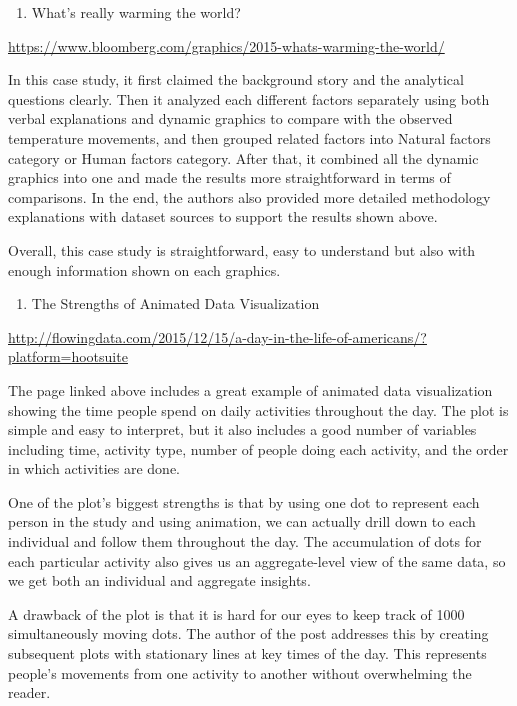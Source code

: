 \documentclass[]{book}
\providecommand{\tightlist}{%
  \setlength{\itemsep}{0pt}\setlength{\parskip}{0pt}}
\theoremstyle{definition}
\theoremstyle{definition}
\theoremstyle{definition}
\theoremstyle{remark}
\begin{document}
\begin{enumerate}
\def\labelenumi{\arabic{enumi}.}
\setcounter{enumi}{5}
\tightlist
\item
  What's really warming the world?
\end{enumerate}

\url{https://www.bloomberg.com/graphics/2015-whats-warming-the-world/}

In this case study, it first claimed the background story and the
analytical questions clearly. Then it analyzed each different factors
separately using both verbal explanations and dynamic graphics to
compare with the observed temperature movements, and then grouped
related factors into Natural factors category or Human factors category.
After that, it combined all the dynamic graphics into one and made the
results more straightforward in terms of comparisons. In the end, the
authors also provided more detailed methodology explanations with
dataset sources to support the results shown above.

Overall, this case study is straightforward, easy to understand but also
with enough information shown on each graphics.

\begin{enumerate}
\def\labelenumi{\arabic{enumi}.}
\setcounter{enumi}{6}
\tightlist
\item
  The Strengths of Animated Data Visualization
\end{enumerate}

\url{http://flowingdata.com/2015/12/15/a-day-in-the-life-of-americans/?platform=hootsuite}

The page linked above includes a great example of animated data
visualization showing the time people spend on daily activities
throughout the day. The plot is simple and easy to interpret, but it
also includes a good number of variables including time, activity type,
number of people doing each activity, and the order in which activities
are done.

One of the plot's biggest strengths is that by using one dot to
represent each person in the study and using animation, we can actually
drill down to each individual and follow them throughout the day. The
accumulation of dots for each particular activity also gives us an
aggregate-level view of the same data, so we get both an individual and
aggregate insights.

A drawback of the plot is that it is hard for our eyes to keep track of
1000 simultaneously moving dots. The author of the post addresses this
by creating subsequent plots with stationary lines at key times of the
day. This represents people's movements from one activity to another
without overwhelming the reader.
\end{document}
